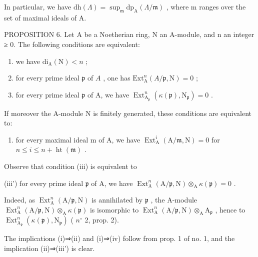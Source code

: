 In particular, we have \(\mathrm{dh}(\Lambda)=\sup_{\mathfrak{m}}\mathrm{dp}_{\mathrm{A}}(\Lambda/\mathfrak{m})\) , where m ranges over the set of maximal ideals of A.

PROPOSITION 6. Let A be a Noetherian ring, N an A-module, and n an integer ≥ 0. The following conditions are equivalent:

\begin{enumerate}
\def\labelenumi{(\roman{enumi})}
\item
  we have \(\mathrm{di}_{\mathrm{A}}(\mathrm{N}) < n\) ;
\item
  for every prime ideal \(\mathfrak{p}\) of \(A\) , one has \(\mathrm{Ext}_{\mathrm{A}}^{n}(A/\mathfrak{p},\mathrm{N})=0\) ;
\item
  for every prime ideal \(\mathfrak{p}\) of A, we have \(\operatorname{Ext}_{\mathrm{A}_{\mathfrak{p}}}^{n}(\kappa(\mathfrak{p}),\mathrm{N}_{\mathfrak{p}})=0\) .
\end{enumerate}

If moreover the A-module N is finitely generated, these conditions are equivalent to:

\begin{enumerate}
\def\labelenumi{(\roman{enumi})}
\setcounter{enumi}{3}
\tightlist
\item
  for every maximal ideal m of A, we have \(\operatorname{Ext}_{\mathrm{A}}^{i}(\mathrm{A}/\mathfrak{m},\mathrm{N})=0\) for \(n\leqslant i\leqslant n+\operatorname{ht}(\mathfrak{m})\) .
\end{enumerate}

Observe that condition (iii) is equivalent to

(iii') for every prime ideal \(\mathfrak{p}\) of A, we have \(\operatorname{Ext}_{\mathrm{A}}^{n}(\mathrm{A}/\mathfrak{p},\mathrm{N})\otimes_{\mathrm{A}}\kappa(\mathfrak{p})=0\) .

Indeed, as \(\operatorname{Ext}_{\mathrm{A}}^{n}(\mathrm{A}/\mathfrak{p},\mathrm{N})\) is annihilated by \(\mathfrak{p}\) , the A-module \(\operatorname{Ext}_{\mathrm{A}}^{n}(\mathrm{A}/\mathfrak{p},\mathrm{N})\otimes_{\mathrm{A}}\kappa(\mathfrak{p})\) is isomorphic to \(\operatorname{Ext}_{\mathrm{A}}^{n}(\mathrm{A}/\mathfrak{p},\mathrm{N})\otimes_{\mathrm{A}}\mathrm{A}_{\mathfrak{p}}\) , hence to \(\operatorname{Ext}_{\mathrm{A}_{\mathfrak{p}}}^{n}(\kappa(\mathfrak{p}),\mathrm{N}_{\mathfrak{p}})\) ( \(n^{\circ}\) 2, prop. 2).

The implications (i)⇒(ii) and (i)⇒(iv) follow from prop. 1 of no. 1, and the implication (ii)⇒(iii') is clear.

